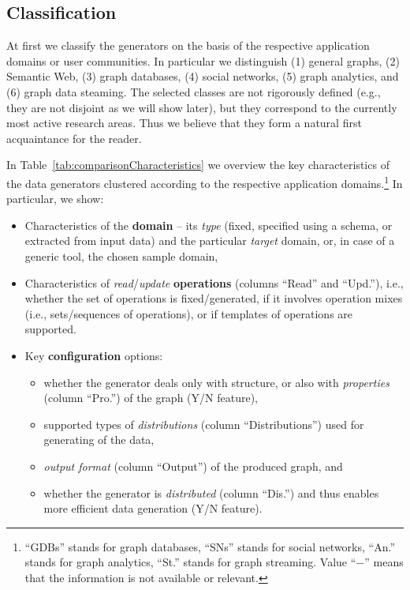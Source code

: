%

\subsection{Classification}

At first we classify the generators on the basis of the respective application domains or user communities. In particular we distinguish (1) general graphs, (2) Semantic Web, (3) graph databases, (4) social networks, (5) graph analytics, and (6) graph data steaming. The selected classes are not rigorously defined (e.g., they are not disjoint as we will show later), but they correspond to the currently most active research areas. Thus we believe that they form a natural first acquaintance for the reader.

In Table~\ref{tab:comparisonCharacteristics}   we overview the key characteristics of the data generators clustered according to the respective application domains.\footnote{``GDBs'' stands for graph databases, ``SNs'' stands for social networks, ``An.'' stands for graph analytics, ``St.'' stands for graph streaming. Value ``$-$'' means that the information is not available or relevant.} In particular, we show:

\begin{itemize}
\item Characteristics of the \textbf{domain} -- its \textit{type} (fixed, specified using a schema, or extracted from input data) and the particular \textit{target} domain, or, in case of a generic tool, the chosen sample domain,
\item Characteristics of \textit{read}/\textit{update} \textbf{operations} (columns ``Read'' and ``Upd.''), i.e., whether the set of operations is fixed/generated, if it involves operation mixes (i.e., sets/sequences of operations), or if templates of operations are supported.
\item Key \textbf{configuration} options:
  \begin{itemize}
    \item whether the generator deals only with structure, or also with \emph{properties} (column ``Pro.'') of the graph (Y/N feature),
    \item supported types of \emph{distributions} (column ``Distributions'') used for generating of the data,
    \item \textit{output format} (column ``Output'') of the produced graph, and
    \item  whether the generator is \textit{distributed} (column ``Dis.'') and thus enables more efficient data generation (Y/N feature).
  \end{itemize}
\end{itemize}




